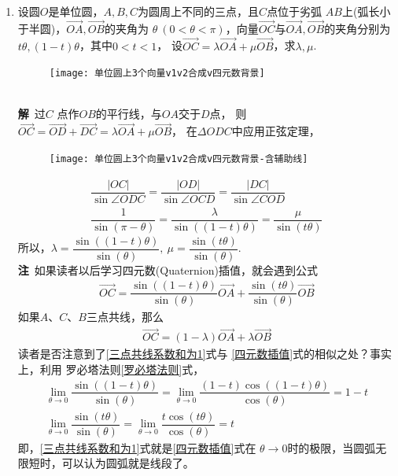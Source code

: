 \begin{enumerate}[label={【\textbf{例\thechapter.\arabic*}】},
 leftmargin=\inteval{\myenumleftmargin}pt,
 itemsep=\inteval{\myenumitempsep}pt,
 itemindent=\inteval{\myenumitemindent}pt]
\item 设圆$ O $是单位圆，$ A,B,C $为圆周上不同的三点，且$ C $点位于劣弧
$ AB $上(弧长小于半圆)，$ \vec{OA},\vec{OB} $的夹角为
$ \theta\ (0<\theta<\pi) $，向量$\vec{OC}$与$ \vec{OA},
\vec{OB} $的夹角分别为$ t\theta,(1-t)\theta $，其中$ 0<t<1 $，
设$ \vec{OC}=\lambda\vec{OA}+\mu\vec{OB} $，求$ \lambda,\mu $.
\begin{figure}[h]
    \centering
    \texttt{[image: 单位圆上3个向量v1v2合成v四元数背景]}
\end{figure} \\
\textbf{解}\ 过$ C $ 点作$ OB $的平行线，与$ OA $交于$ D $点，
则$ \vec{OC}=\vec{OD}+\vec{DC}=\lambda\vec{OA}+\mu\vec{OB} $，
在$ \Delta ODC $中应用正弦定理，
\begin{figure}[h]
    \centering
    \texttt{[image: 单位圆上3个向量v1v2合成v四元数背景-含辅助线]}
    \label{单位圆上3个向量v1v2合成v}
\end{figure}
\begin{gather*}
    \dfrac{|OC|}{\sin\angle ODC}=\dfrac{|OD|}{\sin\angle OCD}
    =\dfrac{|DC|}{\sin\angle COD} \\
    \dfrac{1}{\sin(\pi-\theta)}=
    \dfrac{\lambda}{\sin((1-t)\theta)}=
    \dfrac{\mu}{\sin(t\theta)}
\end{gather*}
所以，$ \lambda=\dfrac{\sin((1-t)\theta)}{\sin(\theta)},\ 
\mu=\dfrac{\sin(t\theta)}{\sin(\theta)} $. \\
\textbf{注}\ 如果读者以后学习四元数(Quaternion)插值，就会遇到公式
\begin{gather}\label{四元数插值}
    \vec{OC}=\dfrac{\sin((1-t)\theta)}{\sin(\theta)}
    \vec{OA}+\dfrac{\sin(t\theta)}{\sin(\theta)}\vec{OB} 
\end{gather}
如果$ A $、$ C $、$ B $三点共线，那么
\begin{gather}\label{三点共线系数和为1}
    \vec{OC}=(1-\lambda)\vec{OA}+\lambda\vec{OB}
\end{gather}
读者是否注意到了\eqref{三点共线系数和为1}式与
\eqref{四元数插值}式的相似之处？事实上，利用
罗必塔法则\eqref{罗必塔法则}式，
\begin{gather*}
    \lim_{\theta\to 0}\dfrac{\sin((1-t)\theta)}{\sin(\theta)}=
    \lim_{\theta\to 0}\dfrac{(1-t)\cos((1-t)\theta)}{\cos(\theta)}
    =1-t \\
    \lim_{\theta\to 0}\dfrac{\sin(t\theta)}{\sin(\theta)}=
    \lim_{\theta\to 0}\dfrac{t\cos(t\theta)}{\cos(\theta)}
    =t
\end{gather*}
即，\eqref{三点共线系数和为1}式就是\eqref{四元数插值}式在
$ \theta\to 0 $时的极限，当圆弧无限短时，可以认为圆弧就是线段了。


\end{enumerate}
